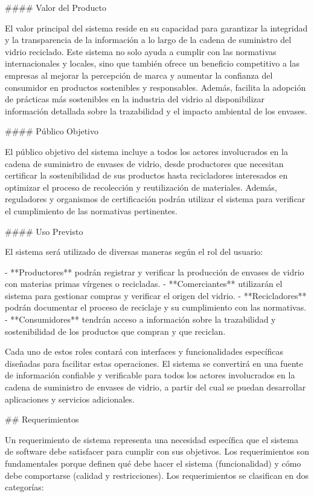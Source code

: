 #### Valor del Producto

El valor principal del sistema reside en su capacidad para garantizar la integridad y la transparencia de la información a lo largo de la cadena de suministro del vidrio reciclado. Este sistema no solo ayuda a cumplir con las normativas internacionales y locales, sino que también ofrece un beneficio competitivo a las empresas al mejorar la percepción de marca y aumentar la confianza del consumidor en productos sostenibles y responsables. Además, facilita la adopción de prácticas más sostenibles en la industria del vidrio al disponibilizar información detallada sobre la trazabilidad y el impacto ambiental de los envases.

#### Público Objetivo

El público objetivo del sistema incluye a todos los actores involucrados en la cadena de suministro de envases de vidrio, desde productores que necesitan certificar la sostenibilidad de sus productos hasta recicladores interesados en optimizar el proceso de recolección y reutilización de materiales. Además, reguladores y organismos de certificación podrán utilizar el sistema para verificar el cumplimiento de las normativas pertinentes.

#### Uso Previsto

El sistema será utilizado de diversas maneras según el rol del usuario:

- **Productores** podrán registrar y verificar la producción de envases de vidrio con materias primas vírgenes o recicladas.
- **Comerciantes** utilizarán el sistema para gestionar compras y verificar el origen del vidrio.
- **Recicladores** podrán documentar el proceso de reciclaje y su cumplimiento con las normativas.
- **Consumidores** tendrán acceso a información sobre la trazabilidad y sostenibilidad de los productos que compran y que reciclan.

Cada uno de estos roles contará con interfaces y funcionalidades específicas diseñadas para facilitar estas operaciones. El sistema se convertirá en una fuente de información confiable y verificable para todos los actores involucrados en la cadena de suministro de envases de vidrio, a partir del cual se puedan desarrollar aplicaciones y servicios adicionales.

## Requerimientos

Un requerimiento de sistema representa una necesidad específica que el sistema de software debe satisfacer para cumplir con sus objetivos. Los requerimientos son fundamentales porque definen qué debe hacer el sistema (funcionalidad) y cómo debe comportarse (calidad y restricciones). Los requerimientos se clasifican en dos categorías:

